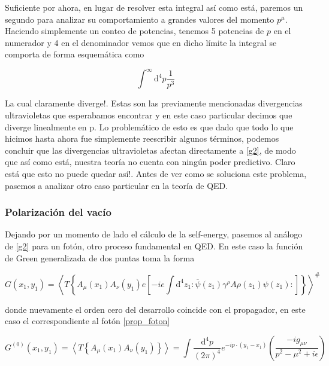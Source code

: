 \documentclass{article}
\numberwithin{equation}{section}
\begin{document}
Suficiente por ahora, en lugar de resolver esta integral así como está, paremos un segundo para analizar su comportamiento a grandes valores del momento $ p^{\mu} $. Haciendo simplemente un conteo de potencias, tenemos 5 potencias de $ p $ en el numerador y 4 en el denominador vemos que en dicho límite la integral se comporta de forma esquemática como

\begin{equation}\label{key}
\int^{\infty} \mathrm{d^4}p \frac{1}{p^3}
\end{equation}

La cual claramente diverge!. Estas son las previamente mencionadas divergencias ultravioletas que esperabamos encontrar y en este caso particular decimos que diverge linealmente en p. Lo problemático de esto es que dado que todo lo que hicimos hasta ahora fue simplemente reescribir algunos términos, podemos concluir que las divergencias ultravioletas afectan directamente a \ref{g2}, de modo que así como está, nuestra teoría no cuenta con ningún poder predictivo. Claro está que esto no puede quedar así!. Antes de ver como se soluciona este problema, pasemos a analizar otro caso particular en la teoría de QED.

\subsubsection{Polarización del vacío} 

Dejando por un momento de lado el cálculo de la self-energy, pasemos al análogo de \ref{g2} para un fotón, otro proceso fundamental en QED. En este caso la función de Green generalizada de dos puntas toma la forma

\begin{equation}\label{qedgreenfot}
G(x_{1},y_{1})=\left\langle T\left\{ A_{\mu}(x_{1})A_{\nu}(y_{1})e\left[-ie\int \mathrm{d^4}z_{1}:\overline{\psi}(z_{1})\gamma^{\rho}A{\rho}(z_{1})\psi(z_{1}):\right]\right\} \right\rangle ^{\#}
\end{equation}

donde nuevamente el orden cero del desarrollo coincide con el propagador, en este caso el correspondiente al fotón \ref{prop_foton}

\begin{equation}\label{key}
G^{(0)}(x_{1},y_{1})=\left\langle T\left\{  A_{\mu}(x_{1})A_{\nu}(y_{1})\right\} \right\rangle = \int\frac{\mathrm{\mathrm{d^4}}p}{(2\pi)^{4}}e^{-ip\cdot(y_1-x_1)}\left(\frac{-ig_{\mu\nu}}{p^2 -\mu^2 +i\epsilon}\right)
\end{equation}
\end{document}
